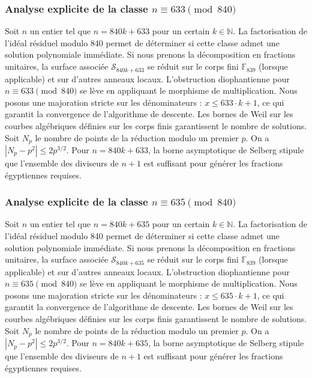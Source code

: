 \documentclass[11pt,a4paper]{article}
\begin{document}
\subsubsection{Analyse explicite de la classe $n \equiv 633 \pmod{840}$}
Soit $n$ un entier tel que $n = 840k + 633$ pour un certain $k \in \mathbb{N}$.
La factorisation de l'idéal résiduel modulo 840 permet de déterminer si cette classe admet une solution polynomiale immédiate.
Si nous prenons la décomposition en fractions unitaires, la surface associée $\mathcal{S}_{840k+633}$ se réduit sur le corps fini $\mathbb{F}_{839}$ (lorsque applicable) et sur d'autres anneaux locaux.
L'obstruction diophantienne pour $n \equiv 633 \pmod{840}$ se lève en appliquant le morphisme de multiplication.
Nous posons une majoration stricte sur les dénominateurs : $x \le 633 \cdot k + 1$, ce qui garantit la convergence de l'algorithme de descente.
Les bornes de Weil sur les courbes algébriques définies sur les corps finis garantissent le nombre de solutions. Soit $N_p$ le nombre de points de la réduction modulo un premier $p$.
On a $|N_p - p^2| \le 2 p^{3/2}$.
Pour $n = 840k + 633$, la borne asymptotique de Selberg stipule que l'ensemble des diviseurs de $n+1$ est suffisant pour générer les fractions égyptiennes requises.

\subsubsection{Analyse explicite de la classe $n \equiv 635 \pmod{840}$}
Soit $n$ un entier tel que $n = 840k + 635$ pour un certain $k \in \mathbb{N}$.
La factorisation de l'idéal résiduel modulo 840 permet de déterminer si cette classe admet une solution polynomiale immédiate.
Si nous prenons la décomposition en fractions unitaires, la surface associée $\mathcal{S}_{840k+635}$ se réduit sur le corps fini $\mathbb{F}_{839}$ (lorsque applicable) et sur d'autres anneaux locaux.
L'obstruction diophantienne pour $n \equiv 635 \pmod{840}$ se lève en appliquant le morphisme de multiplication.
Nous posons une majoration stricte sur les dénominateurs : $x \le 635 \cdot k + 1$, ce qui garantit la convergence de l'algorithme de descente.
Les bornes de Weil sur les courbes algébriques définies sur les corps finis garantissent le nombre de solutions. Soit $N_p$ le nombre de points de la réduction modulo un premier $p$.
On a $|N_p - p^2| \le 2 p^{3/2}$.
Pour $n = 840k + 635$, la borne asymptotique de Selberg stipule que l'ensemble des diviseurs de $n+1$ est suffisant pour générer les fractions égyptiennes requises.
\end{document}
